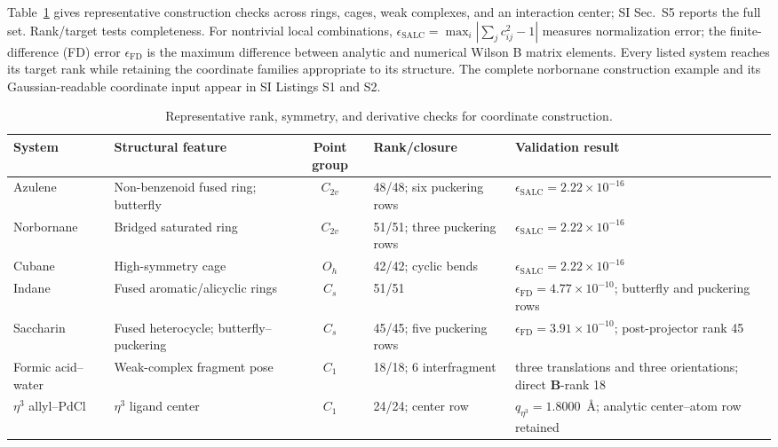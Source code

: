 \documentclass[journal=jctcce,manuscript=article,layout=traditional]{achemso}
\newcommand{\Bmat}{\mathbf{B}}
\theoremstyle{definition}
\begin{document}
{Table~\ref{tab:validation} gives representative
construction checks across rings, cages, weak complexes, and an interaction
center; SI Sec.~S5 reports the full set.  Rank/target tests completeness.
For nontrivial local combinations,
\(\epsilon_{\mathrm{SALC}}=\max_i|\sum_j c_{ij}^{2}-1|\) measures
normalization error; the finite-difference (FD) error \(\epsilon_{\mathrm{FD}}\)
is the maximum difference between analytic and numerical Wilson B matrix
elements.  Every
listed system reaches its target rank while retaining the coordinate families
appropriate to its structure. The complete norbornane construction example
and its Gaussian-readable coordinate input appear in SI Listings S1 and S2.}
\begin{table}[htbp]
\centering
\footnotesize
\setlength{\tabcolsep}{4pt}
\caption{{Representative rank, symmetry, and derivative checks
for coordinate construction.}}
\label{tab:validation}
\begin{tabularx}{\linewidth}{@{}l>{\raggedright\arraybackslash}Xc l>{\raggedright\arraybackslash}X@{}}
\toprule
System & Structural feature & {Point group} & Rank/closure & Validation result \\
\midrule
Azulene & Non-benzenoid fused ring; butterfly & \(C_{2v}\) & 48/48; six puckering rows & \(\epsilon_\mathrm{SALC}=2.22\times10^{-16}\) \\
Norbornane & Bridged saturated ring & \(C_{2v}\) & 51/51; three puckering rows & \(\epsilon_\mathrm{SALC}=2.22\times10^{-16}\) \\
Cubane & High-symmetry cage & \(O_h\) & 42/42; cyclic bends & \(\epsilon_\mathrm{SALC}=2.22\times10^{-16}\) \\
Indane & Fused aromatic/alicyclic rings & \(C_s\) & 51/51 & \(\epsilon_\mathrm{FD}=4.77\times10^{-10}\); butterfly and puckering rows \\
Saccharin & Fused heterocycle; butterfly--puckering & \(C_s\) & 45/45; five puckering rows & \(\epsilon_\mathrm{FD}=3.91\times10^{-10}\); post-projector rank 45 \\
Formic acid--water & Weak-complex fragment pose & \(C_1\) & 18/18; 6 interfragment & three translations and three orientations; direct \(\Bmat\)-rank 18 \\
$\eta^3$ allyl--PdCl & $\eta^3$ ligand center & \(C_1\) & 24/24; center row & \(q_{\eta^3}=1.8000\)~\AA; analytic center--atom row retained \\
\bottomrule
\end{tabularx}
\end{table}
\end{document}
